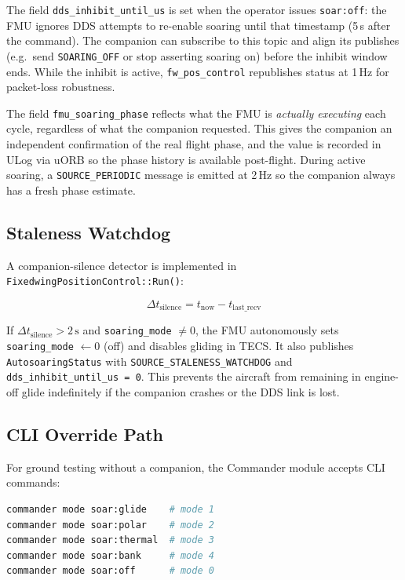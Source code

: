 \documentclass[12pt,a4paper]{article}
\begin{document}
The field \texttt{dds\_inhibit\_until\_us} is set when the operator issues
\texttt{soar:off}: the FMU ignores DDS attempts to re-enable soaring until that
timestamp (5\,s after the command). The companion can subscribe to this topic
and align its publishes (e.g.\ send \texttt{SOARING\_OFF} or stop asserting
soaring on) before the inhibit window ends. While the inhibit is active,
\texttt{fw\_pos\_control} republishes status at 1\,Hz for packet-loss robustness.

The field \texttt{fmu\_soaring\_phase} reflects what the FMU is \emph{actually
executing} each cycle, regardless of what the companion requested. This gives
the companion an independent confirmation of the real flight phase, and the
value is recorded in ULog via uORB so the phase history is available
post-flight. During active soaring, a \texttt{SOURCE\_PERIODIC} message is
emitted at 2\,Hz so the companion always has a fresh phase estimate.

\subsection{Staleness Watchdog}

A companion-silence detector is implemented in
\texttt{FixedwingPositionControl::Run()}:

\begin{equation}
  \Delta t_{\text{silence}} = t_{\text{now}} - t_{\text{last\_recv}}
\end{equation}

If $\Delta t_{\text{silence}} > 2\,\text{s}$ and
\texttt{soaring\_mode} $\neq 0$, the FMU autonomously sets
\texttt{soaring\_mode} $\leftarrow 0$ (off) and disables gliding in TECS.
It also publishes \texttt{AutosoaringStatus} with
\texttt{SOURCE\_STALENESS\_WATCHDOG} and \texttt{dds\_inhibit\_until\_us = 0}.
This prevents the aircraft from remaining in engine-off glide indefinitely
if the companion crashes or the DDS link is lost.

\subsection{CLI Override Path}

For ground testing without a companion, the Commander module accepts CLI
commands:

\begin{lstlisting}[language=bash]
commander mode soar:glide    # mode 1
commander mode soar:polar    # mode 2
commander mode soar:thermal  # mode 3
commander mode soar:bank     # mode 4
commander mode soar:off      # mode 0
\end{lstlisting}
\end{document}
